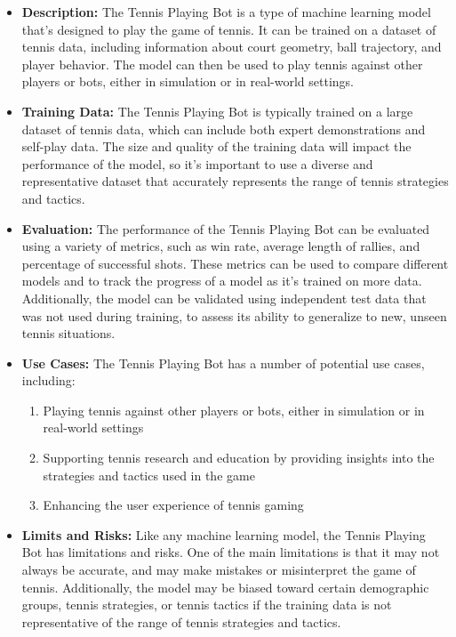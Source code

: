\begin{itemize}
    \item \textbf{Description:} The Tennis Playing Bot is a type of machine learning model that's designed to play the game of tennis. It can be trained on a dataset of tennis data, including information about court geometry, ball trajectory, and player behavior. The model can then be used to play tennis against other players or bots, either in simulation or in real-world settings.
    \item \textbf{Training Data:} The Tennis Playing Bot is typically trained on a large dataset of tennis data, which can include both expert demonstrations and self-play data. The size and quality of the training data will impact the performance of the model, so it's important to use a diverse and representative dataset that accurately represents the range of tennis strategies and tactics.
    \item \textbf{Evaluation:} The performance of the Tennis Playing Bot can be evaluated using a variety of metrics, such as win rate, average length of rallies, and percentage of successful shots. These metrics can be used to compare different models and to track the progress of a model as it's trained on more data. Additionally, the model can be validated using independent test data that was not used during training, to assess its ability to generalize to new, unseen tennis situations.
    \item \textbf{Use Cases:} The Tennis Playing Bot has a number of potential use cases, including:
        \begin{enumerate}  
            \item Playing tennis against other players or bots, either in simulation or in real-world settings
            \item Supporting tennis research and education by providing insights into the strategies and tactics used in the game
            \item Enhancing the user experience of tennis gaming
        \end{enumerate}
    \item \textbf{Limits and Risks:} Like any machine learning model, the Tennis Playing Bot has limitations and risks. One of the main limitations is that it may not always be accurate, and may make mistakes or misinterpret the game of tennis. Additionally, the model may be biased toward certain demographic groups, tennis strategies, or tennis tactics if the training data is not representative of the range of tennis strategies and tactics.

\end{itemize}
